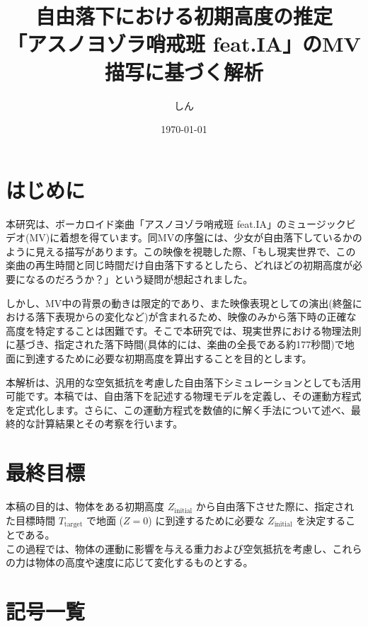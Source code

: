 \documentclass[a4paper,12pt]{article}
\title{自由落下における初期高度の推定 \\ \large 「アスノヨゾラ哨戒班 feat.IA」のMV描写に基づく解析}
\author{しん}
\date{\today}
\begin{document}
\maketitle

\tableofcontents
\newpage

\section{はじめに}
\label{sec:intro}

本研究は、ボーカロイド楽曲「アスノヨゾラ哨戒班 feat.IA」のミュージックビデオ(MV)に着想を得ています。同MVの序盤には、少女が自由落下しているかのように見える描写があります。この映像を視聴した際、「もし現実世界で、この楽曲の再生時間と同じ時間だけ自由落下するとしたら、どれほどの初期高度が必要になるのだろうか？」という疑問が想起されました。

しかし、MV中の背景の動きは限定的であり、また映像表現としての演出(終盤における落下表現からの変化など)が含まれるため、映像のみから落下時の正確な高度を特定することは困難です。そこで本研究では、現実世界における物理法則に基づき、指定された落下時間(具体的には、楽曲の全長である約177秒間)で地面に到達するために必要な初期高度を算出することを目的とします。

本解析は、汎用的な空気抵抗を考慮した自由落下シミュレーションとしても活用可能です。本稿では、自由落下を記述する物理モデルを定義し、その運動方程式を定式化します。さらに、この運動方程式を数値的に解く手法について述べ、最終的な計算結果とその考察を行います。

\section{最終目標}
本稿の目的は、物体をある初期高度 $Z_{\mathrm{initial}}$ から自由落下させた際に、指定された目標時間 $T_{\mathrm{target}}$ で地面 ($Z=0$) に到達するために必要な $Z_{\mathrm{initial}}$ を決定することである。\\
この過程では、物体の運動に影響を与える重力および空気抵抗を考慮し、これらの力は物体の高度や速度に応じて変化するものとする。

\section{記号一覧}
\label{sec:symbols}
\end{document}
